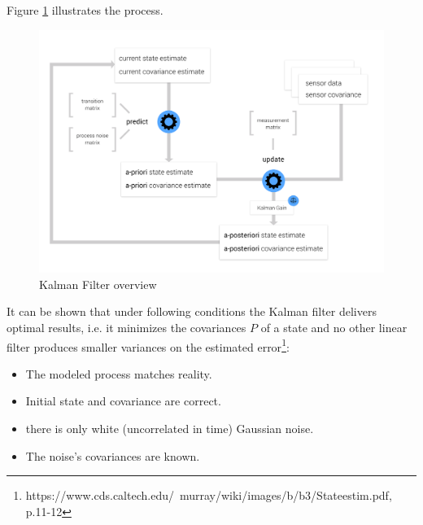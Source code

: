 Figure \ref{kalman} illustrates the process.

\begin{figure}[ht]
\centering
\includegraphics[width=\textwidth]{graphics/Kalman-Filter.png}
\caption{Kalman Filter overview}
\label{kalman}
\centering
\end{figure}

It can be shown that under following conditions the Kalman filter delivers optimal results, i.e. it minimizes the covariances $P$ of a state and no other linear filter produces smaller variances on the estimated error\footnote{https://www.cds.caltech.edu/~murray/wiki/images/b/b3/Stateestim.pdf, p.11-12}:

\begin{itemize}
\item The modeled process matches reality.
\item Initial state and covariance are correct.
\item there is only white (uncorrelated in time) Gaussian noise.
\item The noise's covariances are known.
\end{itemize}

